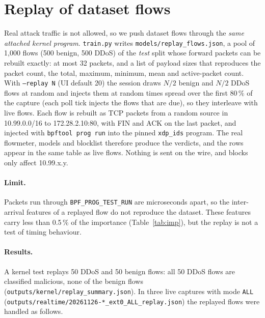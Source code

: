 
\section{Replay of dataset flows}\label{sec:replay}
Real attack traffic is not allowed, so we push dataset flows through the \emph{same attached kernel program}. \texttt{train.py} writes \texttt{models/replay\_flows.json}, a pool of 1,000 flows (500 benign, 500 DDoS) of the \emph{test} split whose forward packets can be rebuilt exactly: at most 32 packets, and a list of payload sizes that reproduces the packet count, the total, maximum, minimum, mean and active-packet count. With \texttt{--replay N} (UI default 20) the session draws $N/2$ benign and $N/2$ DDoS flows at random and injects them at random times spread over the first 80\,\% of the capture (each poll tick injects the flows that are due), so they interleave with live flows. Each flow is rebuilt as TCP packets from a random source in 10.99.0.0/16 to 172.28.2.10:80, with FIN and ACK on the last packet, and injected with \texttt{bpftool prog run} into the pinned \texttt{xdp\_ids} program. The real flowmeter, models and blocklist therefore produce the verdicts, and the rows appear in the same table as live flows. Nothing is sent on the wire, and blocks only affect 10.99.x.y.

\paragraph{Limit.} Packets run through \texttt{BPF\_PROG\_TEST\_RUN} are microseconds apart, so the inter-arrival features of a replayed flow do not reproduce the dataset. These features carry less than 0.5\,\% of the importance (Table~\ref{tab:imp}), but the replay is not a test of timing behaviour.

\paragraph{Results.} A kernel test replays 50 DDoS and 50 benign flows: all 50 DDoS flows are classified malicious, none of the benign flows (\texttt{outputs/kernel/replay\_summary.json}). In three live captures with mode \texttt{ALL} (\texttt{outputs/realtime/20261126-*\_ext0\_ALL\_replay.json}) the replayed flows were handled as follows.

